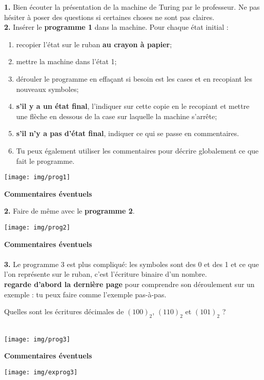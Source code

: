\documentclass[a4paper,12pt,french]{article}
\begin{document}

\textbf{1.} Bien écouter la présentation de la machine de Turing par le professeur. Ne pas hésiter à poser des questions si certaines choses ne sont pas claires.\\


\textbf{2.} Insérer le \textbf{programme 1}  dans la machine. Pour chaque état initial :
\begin{enumerate}[--]
	\item recopier l'état sur le ruban \textbf{au crayon à papier};
    \item mettre la machine dans l'état 1;
    \item dérouler le programme en effaçant si besoin est les cases et en recopiant les nouveaux symboles;
    \item \textbf{s'il y a un état final}, l'indiquer sur cette copie en le recopiant et mettre une flèche en dessous de la case sur laquelle la machine s'arrête;
    \item \textbf{s'il n'y a pas d'état final}, indiquer ce qui se passe en commentaires.
    \item  Tu peux également utiliser les commentaires pour décrire globalement ce que fait le programme.
\end{enumerate}
\begin{center}
\texttt{[image: img/prog1]}
\end{center}
\textbf{Commentaires éventuels}\\


\textbf{2.} Faire de même avec le \textbf{programme 2}.

\begin{center}
\texttt{[image: img/prog2]}
\end{center}
\textbf{Commentaires éventuels}\\

\\

\textbf{3.} Le programme 3 est plus compliqué: les symboles sont des 0 et des 1 et ce que l'on représente sur le ruban, c'est l'écriture binaire d'un nombre.\\
\textbf{regarde d'abord la dernière page} pour comprendre son déroulement sur un exemple : tu peux faire comme l'exemple pas-à-pas.

Quelles sont les écritures décimales de $(100)_2$, $(110)_2$ et $(101)_2$ ?\\

\\




\begin{center}
\texttt{[image: img/prog3]}
\end{center}

\textbf{Commentaires éventuels}\\


\newpage
\texttt{[image: img/exprog3]}
\end{document}
